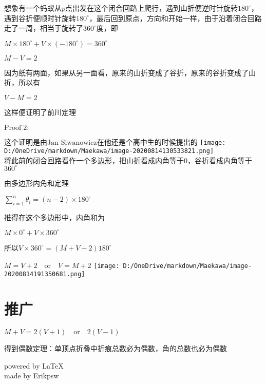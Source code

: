 \documentclass[a4paper,12pt]{article}
\begin{document}
想象有一个蚂蚁从$p$点出发在这个闭合回路上爬行，遇到山折便逆时针旋转$180^{\circ}$，遇到谷折便顺时针旋转$180^{\circ}$，最后回到原点，方向和开始一样，由于沿着闭合回路走了一周，相当于旋转了$360^{\circ}$度，即

$M \times 180^{\circ} +V \times (-180^{\circ}) = 360^{\circ}$

$M - V = 2$

因为纸有两面，如果从另一面看，原来的山折变成了谷折，原来的谷折变成了山折，所以有

$V - M = 2$

这样便证明了前川定理

$\text{Proof}\;2:$

这个证明是由$\text{Jan Siwanowicz}$在他还是个高中生的时候提出的
\texttt{[image: D:/OneDrive/markdown/Maekawa/image-20200814130533821.png]}\\


将此前的闭合回路看作一个多边形，把山折看成内角等于$0$，谷折看成内角等于$360^{\circ}$

由多边形内角和定理

$\sum\limits_{i=1}^n\theta_i=(n-2)×180^{\circ}$

推得在这个多边形中，内角和为

$M \times 0^{\circ} +V \times 360^{\circ}$

所以$V\times 360^{\circ} = (M +V-2)180^{\circ}$

$ M = V +2 \quad \text{or}\quad V = M + 2$
\texttt{[image: D:/OneDrive/markdown/Maekawa/image-20200814191350681.png]}\\


\section{推广}

$M + V = 2(V+1) \quad \text{or} \quad2(V- 1)$

得到偶数定理：单顶点折叠中折痕总数必为偶数，角的总数也必为偶数
\begin{flushright}
    powered by \LaTeX\\
    made by Erikpsw\\ 
\end{flushright}
\end{document}
